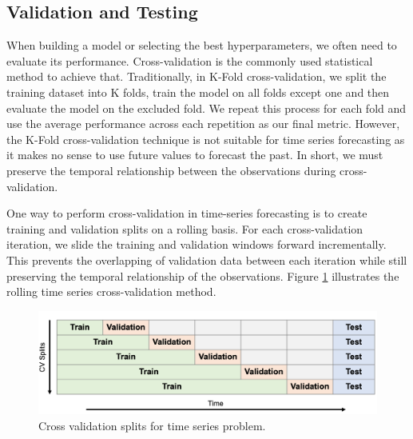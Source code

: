 \documentclass{article}
\begin{document}
\subsection{Validation and Testing}
\label{sect:testing}
When building a model or selecting the best hyperparameters, we often need to evaluate its performance. Cross-validation \cite{cv1995} is the commonly used statistical method to achieve that. Traditionally, in K-Fold cross-validation, we split the training dataset into K folds, train the model on all folds except one and then evaluate the model on the excluded fold. We repeat this process for each fold and use the average performance across each repetition as our final metric. However, the K-Fold cross-validation technique is not suitable for time series forecasting as it makes no sense to use future values to forecast the past. In short, we must preserve the temporal relationship between the observations during cross-validation.

One way to perform cross-validation in time-series forecasting is to create training and validation splits on a rolling basis. For each cross-validation iteration, we slide the training and validation windows forward incrementally. This prevents the overlapping of validation data between each iteration while still preserving the temporal relationship of the observations. Figure \ref{fig:cvsplit} illustrates the rolling time series cross-validation method.

\begin{figure}[htbp]
     \centering
     \includegraphics[width=.75\textwidth]{images/cv splits.png}
    \caption{Cross validation splits for time series problem.}
    \label{fig:cvsplit}
\end{figure}
\end{document}
